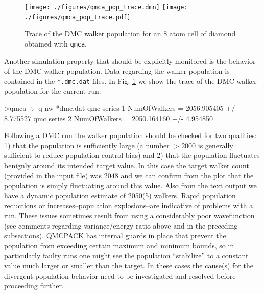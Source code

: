 \begin{figure}
\begin{center}
  \ifdefined\HCode
\texttt{[image: ./figures/qmca\_pop\_trace.dmn]}
\else
\texttt{[image: ./figures/qmca\_pop\_trace.pdf]}
\fi
\end{center}
\caption{Trace of the DMC walker population for an 8 atom cell of diamond obtained with \texttt{qmca}.}
\label{fig:qmca_pop_trace}
\end{figure}

Another simulation property that should be explicitly monitored  
is the behavior of the DMC walker population.  Data regarding the 
walker population is contained in the \texttt{*.dmc.dat} files.
In Fig. \ref{fig:qmca_pop_trace} we show the trace of the DMC 
walker population for the current run:
\begin{shade}
>qmca -t -q nw *dmc.dat
qmc  series 1  NumOfWalkers          =  2056.905405 +/- 8.775527 
qmc  series 2  NumOfWalkers          =  2050.164160 +/- 4.954850 
\end{shade}
\noindent
Following a DMC run the walker population should be checked for 
two qualities: 1) that the population is sufficiently large (a number 
$>2000$ is generally sufficient to reduce population control bias) and  
2) that the population fluctuates benignly around its intended target 
value. In this case the target walker count (provided in the input file)
was $2048$ and we can confirm from the plot that the population is simply 
fluctuating around this value.  Also from the text output we have a dynamic 
population estimate of 2050(5) walkers.  Rapid population reductions or 
increases--population explosions--are indicative of problems with a run.  
These issues sometimes result from using a considerably poor wavefunction 
(see comments regarding variance/energy ratio above and in the preceding 
subsections).  QMCPACK has internal guards in place that prevent 
the population from exceeding certain maximum and minimum bounds, so 
in particularly faulty runs one might see the population ``stabilize'' 
to a constant value much larger or smaller than the target.  In these 
cases the cause(s) for the divergent population behavior need to 
be investigated and resolved before proceeding further.



